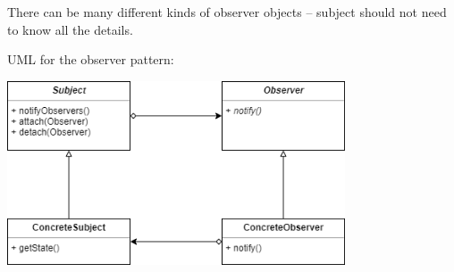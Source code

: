 \documentclass[11pt]{article}
\theoremstyle{definition}
\begin{document}
There can be many different kinds of observer objects -- subject should not need to know all the details.

UML for the observer pattern:
\begin{center}
\includegraphics[width=0.75\textwidth]{images/observerUML.png}
\end{center}
\end{document}

